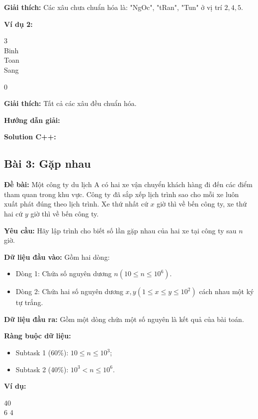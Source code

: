 \documentclass[12pt]{scrartcl}  %
\begin{document}
\textbf{Giải thích:}
Các xâu chưa chuẩn hóa là: "NgOc", "tRan", "Tun" ở vị trí $2, 4, 5$.

\textbf{Ví dụ 2:}
\begin{tcolorbox}[colback=gray!5!white, colframe=blue!50!black, title=Input]
3\\
Binh\\
Toan\\
Sang
\end{tcolorbox}

\begin{tcolorbox}[colback=gray!5!white, colframe=green!50!black, title=Output]
0
\end{tcolorbox}

\textbf{Giải thích:}
Tất cả các xâu đều chuẩn hóa.

\textbf{Hướng dẫn giải:}

\textbf{Solution C++:}

\subsection{Bài 3: Gặp nhau}

\textbf{Đề bài:}
Một công ty du lịch A có hai xe vận chuyển khách hàng đi đến các điểm tham quan trong khu vực. Công ty đã sắp xếp lịch trình sao cho mỗi xe 
luôn xuất phát đúng theo lịch trình. Xe thứ nhất cứ $x$ giờ thì về bến công ty, xe thứ hai cứ $y$ giờ thì về bến công ty.

\textbf{Yêu cầu:}
Hãy lập trình cho biết số lần gặp nhau của hai xe tại công ty sau $n$ giờ.

\textbf{Dữ liệu đầu vào:}
Gồm hai dòng:
\begin{itemize}
    \item Dòng 1: Chứa số nguyên dương $n (10 \leq n \leq 10^6)$.
    \item Dòng 2: Chứa hai số nguyên dương $x, y (1 \leq x \leq y \leq 10^2)$ cách nhau một ký tự trắng.
\end{itemize}

\textbf{Dữ liệu đầu ra:}
Gồm một dòng chứa một số nguyên là kết quả của bài toán.

\textbf{Ràng buộc dữ liệu:}
\begin{itemize}
    \item Subtask 1 (60\%): $10 \leq n \leq 10^3$;
    \item Subtask 2 (40\%): $10^3 < n \leq 10^6$.
\end{itemize}

\textbf{Ví dụ:}
\begin{tcolorbox}[colback=gray!5!white, colframe=blue!50!black, title=Input]
40\\ 
6 4
\end{tcolorbox}
\end{document}
